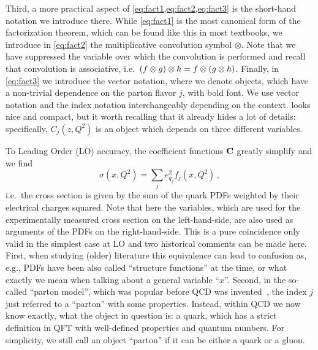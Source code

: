 Third, a more practical aspect of \cref{eq:fact1,eq:fact2,eq:fact3} is the short-hand notation we introduce there.
While \cref{eq:fact1} is the most canonical form of the factorization theorem, which can be found like this in most textbooks, we introduce in \cref{eq:fact2} the multiplicative convolution symbol $\otimes$.
Note that we have suppressed the variable over which the convolution is performed and recall that convolution is associative, i.e.\ $\qty(f\otimes g)\otimes h = f\otimes\qty(g\otimes h)$.
Finally, in \cref{eq:fact3} we introduce the vector notation, where we denote objects, which have a non-trivial dependence on the parton flavor $j$, with bold font.
We use vector notation and the index notation interchangeably depending on the context.
 looks nice and compact, but it worth recalling that it already hides a lot of details: specifically, $C_j(z,Q^2)$ is an object which depends on three different variables.

To Leading Order (LO) accuracy, the coefficient functions $\vb C$ greatly simplify and we find
\begin{equation}
    \sigma(x,Q^2) = \sum_j e_{q_j}^2 f_j(x,Q^2)\,, \label{eq:LOxs}
\end{equation}
i.e.\ the cross section is given by the sum of the quark PDFs weighted by their electrical charges squared.
Note that here the variables, which are used for the experimentally measured cross section on the left-hand-side, are also used as arguments of the PDFs on the right-hand-side.
This is a pure coincidence only valid in the simplest case at LO and two historical comments can be made here.
First, when studying (older) literature this equivalence can lead to confusion as, e.g., PDFs have been also called \enquote{structure functions} at the time, or what exactly we mean when talking about a general variable \enquote{$x$}.
Second, in the so-called \enquote{parton model}, which was popular before QCD was invented~\cite{Soper:2026kvo}, the index $j$ just referred to a \enquote{parton} with some properties.
Instead, within QCD we now know exactly, what the object in question is: a quark, which has a strict definition in QFT with well-defined properties and quantum numbers.
For simplicity, we still call an object \enquote{parton} if it can be either a quark or a gluon.
